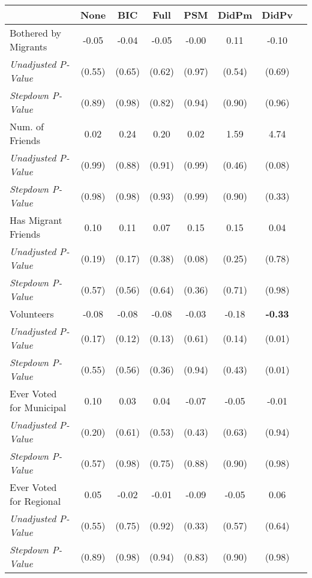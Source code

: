 \begin{tabular}{l c c c c c c c}
\toprule
 & None & BIC & Full & PSM & DidPm & DidPv \\
\midrule
Bothered by Migrants & -0.05 & -0.04 & -0.05 & -0.00 & 0.11 & -0.10 \\
\quad \textit{Unadjusted P-Value} & (0.55) & (0.65) & (0.62) & (0.97) & (0.54) & (0.69) \\
\quad \textit{Stepdown P-Value} & (0.89) & (0.98) & (0.82) & (0.94) & (0.90) & (0.96) \\
Num. of Friends & 0.02 & 0.24 & 0.20 & 0.02 & 1.59 & 4.74 \\
\quad \textit{Unadjusted P-Value} & (0.99) & (0.88) & (0.91) & (0.99) & (0.46) & (0.08) \\
\quad \textit{Stepdown P-Value} & (0.98) & (0.98) & (0.93) & (0.99) & (0.90) & (0.33) \\
Has Migrant Friends & 0.10 & 0.11 & 0.07 & 0.15 & 0.15 & 0.04 \\
\quad \textit{Unadjusted P-Value} & (0.19) & (0.17) & (0.38) & (0.08) & (0.25) & (0.78) \\
\quad \textit{Stepdown P-Value} & (0.57) & (0.56) & (0.64) & (0.36) & (0.71) & (0.98) \\
Volunteers & -0.08 & -0.08 & -0.08 & -0.03 & -0.18 & \textbf{ -0.33 } \\
\quad \textit{Unadjusted P-Value} & (0.17) & (0.12) & (0.13) & (0.61) & (0.14) & (0.01) \\
\quad \textit{Stepdown P-Value} & (0.55) & (0.56) & (0.36) & (0.94) & (0.43) & (0.01) \\
Ever Voted for Municipal & 0.10 & 0.03 & 0.04 & -0.07 & -0.05 & -0.01 \\
\quad \textit{Unadjusted P-Value} & (0.20) & (0.61) & (0.53) & (0.43) & (0.63) & (0.94) \\
\quad \textit{Stepdown P-Value} & (0.57) & (0.98) & (0.75) & (0.88) & (0.90) & (0.98) \\
Ever Voted for Regional & 0.05 & -0.02 & -0.01 & -0.09 & -0.05 & 0.06 \\
\quad \textit{Unadjusted P-Value} & (0.55) & (0.75) & (0.92) & (0.33) & (0.57) & (0.64) \\
\quad \textit{Stepdown P-Value} & (0.89) & (0.98) & (0.94) & (0.83) & (0.90) & (0.98) \\
\bottomrule
\end{tabular}
